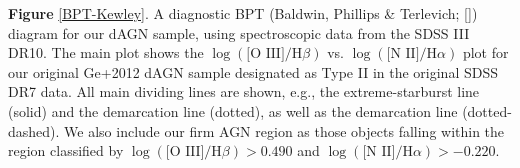\label{BPT-Kewley} \textbf{Figure} \ref{BPT-Kewley}. A diagnostic BPT (Baldwin, Phillips \& Terlevich; [\cite{Baldwin_1981}]) diagram for our dAGN sample, using spectroscopic data from the SDSS III DR10. The main plot shows the $\log(\text{[O III]}/\text{H}\beta)$ vs. $\log(\text{[N II]}/\text{H}\alpha)$ plot for our original Ge+2012 dAGN sample designated as Type II in the original SDSS DR7 data. All main dividing lines are shown, e.g., the \cite{Kewley_Dopita_Sutherland_Heisler_Trevena_2001} extreme-starburst line (solid) and the \cite{Kauffmann_2003} demarcation line (dotted), as well as the \cite{Stasinska_2006} demarcation line (dotted-dashed). We also include our firm AGN region as those objects falling within the region classified by $\log(\text{[O III]}/\text{H}\beta)>{0.490}$ and $\log(\text{[N II]}/\text{H}\alpha)>{-0.220}$. 